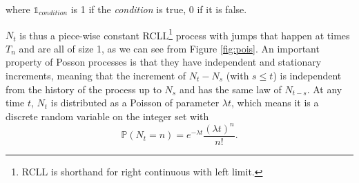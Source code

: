 \noindent
where $\mathds{1}_{condition}$ is 1 if the \textit{condition} is true, 0 if it is false.

$N_t$ is thus a piece-wise constant RCLL\footnote{RCLL is shorthand for right continuous with left limit.} process with jumps that happen at times $T_n$ and are all of size 1, as we can see from Figure \ref{fig:pois}.
An important property of Posson processes is that they have independent and stationary increments, meaning that the increment of $N_t - N_s$ (with $s\leq t$) is independent from the history of the process up to $N_s$ and has the same law of $N_{t-s}$.
At any time $t$, $N_t$ is distributed as a Poisson of parameter $\lambda t$, which means it is a discrete random variable on the integer set with
\begin{equation}
\label{eq:pois_pdf}
\mathbb{P}( N_t = n) = e^{-\lambda t}\frac{(\lambda t)^n}{n!}.
\end{equation}



